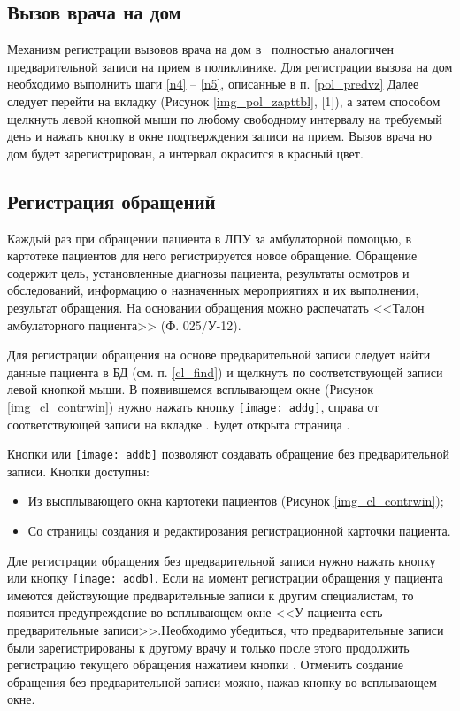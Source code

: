 \subsection{Вызов врача на дом} \label{pol_home}

Механизм регистрации вызовов врача на дом в \tmis~полностью аналогичен предварительной записи на прием в поликлинике. Для регистрации вызова на дом необходимо выполнить шаги \ref{n4} -- \ref{n5}, описанные в п. \ref{pol_predvz} Далее следует перейти на вкладку  (Рисунок \ref{img_pol_zapttbl}, [1]), а затем способом щелкнуть левой кнопкой мыши по любому свободному интервалу на требуемый день и нажать кнопку  в окне подтверждения записи на прием. Вызов врача но дом будет зарегистрирован, а интервал окрасится в красный цвет.

\subsection {Регистрация обращений} \label{pol_obr}

Каждый раз при обращении пациента в ЛПУ за амбулаторной помощью, в картотеке пациентов для него регистрируется новое обращение. Обращение содержит цель, установленные диагнозы пациента, результаты осмотров и обследований, информацию о назначенных мероприятиях и их выполнении, результат обращения. На основании обращения можно распечатать <<Талон амбулаторного пациента>> (Ф. 025\slash У-12).

Для регистрации обращения на основе предварительной записи следует найти данные пациента в БД (см. п. \ref{cl_find}) и щелкнуть по соответствующей записи левой кнопкой мыши. В появившемся всплывающем окне (Рисунок \ref{img_cl_contrwin}) нужно нажать кнопку \texttt{[image: addg]}, справа от соответствующей записи на вкладке . Будет открыта страница .

Кнопки  или \texttt{[image: addb]} позволяют создавать обращение без предварительной записи. Кнопки доступны:
\begin{itemize}
 \item Из высплывающего окна картотеки пациентов (Рисунок \ref{img_cl_contrwin});
 \item Со страницы создания и редактирования регистрационной карточки пациента. 
\end{itemize}

Дле регистрации обращения без предварительной записи нужно нажать кнопку  или кнопку \texttt{[image: addb]}. Если на момент регистрации обращения у пациента имеются действующие предварительные записи к другим специалистам, то появится предупреждение во всплывающем окне <<У пациента есть предварительные записи>>.Необходимо убедиться, что предварительные записи были зарегистрированы к другому врачу и только после этого продолжить регистрацию текущего обращения нажатием кнопки . Отменить создание обращения без предварительной записи можно, нажав кнопку   во всплывающем окне.

